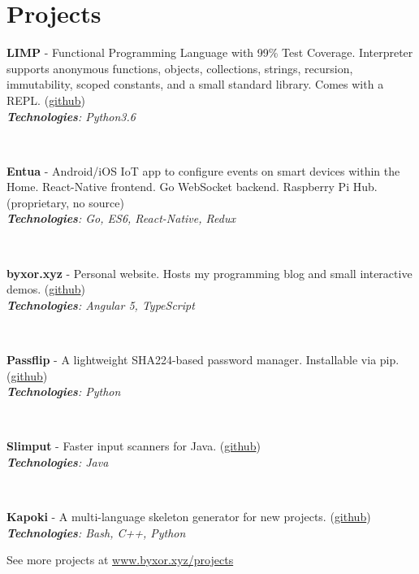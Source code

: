 \documentclass{article}
\begin{document}
\section{Projects}
\vspace{1em}
\begin{multicols}{2}
\parbox{\linewidth}{\textbf{LIMP} - Functional Programming Language with 99\% Test Coverage. Interpreter supports anonymous functions, objects, collections, strings, recursion, immutability, scoped constants, and a small standard library. Comes with a REPL. (\href{http://www.github.com/byxor/limp}{github})\\
\textit{\textbf{Technologies}: Python3.6}}\vspace{1.5em}\\\parbox{\linewidth}{\textbf{Entua} - Android/iOS IoT app to configure events on smart devices within the Home. React-Native frontend. Go WebSocket backend. Raspberry Pi Hub. (proprietary, no source)\\
\textit{\textbf{Technologies}: Go, ES6, React-Native, Redux}}\vspace{1.5em}\\\parbox{\linewidth}{\textbf{byxor.xyz} - Personal website. Hosts my programming blog and small interactive demos. (\href{http://www.github.com/byxor/website}{github})\\
\textit{\textbf{Technologies}: Angular 5, TypeScript}}\vspace{1.5em}\\\parbox{\linewidth}{\textbf{Passflip} - A lightweight SHA224-based password manager. Installable via pip. (\href{http://www.github.com/byxor/passflip}{github})\\
\textit{\textbf{Technologies}: Python}}\vspace{1.5em}\\\parbox{\linewidth}{\textbf{Slimput} - Faster input scanners for Java. (\href{http://www.github.com/byxor/slimput}{github})\\
\textit{\textbf{Technologies}: Java}}\vspace{1.5em}\\\parbox{\linewidth}{\textbf{Kapoki} - A multi-language skeleton generator for new projects. (\href{http://www.github.com/byxor/kapoki}{github})\\
\textit{\textbf{Technologies}: Bash, C++, Python}}
\end{multicols}
\begin{center}
\vspace{1em}
See more projects at \url{www.byxor.xyz/projects}
\end{center}
\end{document}
